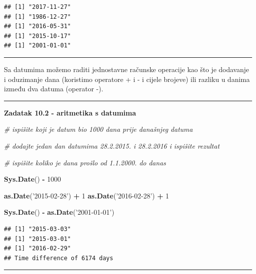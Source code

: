 \documentclass[]{book}
\newenvironment{Shaded}{\begin{snugshade}}{\end{snugshade}}
\newcommand{\KeywordTok}[1]{\textcolor[rgb]{0.13,0.29,0.53}{\textbf{#1}}}
\newcommand{\DecValTok}[1]{\textcolor[rgb]{0.00,0.00,0.81}{#1}}
\newcommand{\StringTok}[1]{\textcolor[rgb]{0.31,0.60,0.02}{#1}}
\newcommand{\CommentTok}[1]{\textcolor[rgb]{0.56,0.35,0.01}{\textit{#1}}}
\newcommand{\OperatorTok}[1]{\textcolor[rgb]{0.81,0.36,0.00}{\textbf{#1}}}
\newcommand{\NormalTok}[1]{#1}
\theoremstyle{definition}
\theoremstyle{definition}
\theoremstyle{definition}
\theoremstyle{remark}
\begin{document}
\begin{verbatim}
## [1] "2017-11-27"
## [1] "1986-12-27"
## [1] "2016-05-31"
## [1] "2015-10-17"
## [1] "2001-01-01"
\end{verbatim}

\begin{center}\rule{0.5\linewidth}{\linethickness}\end{center}

Sa datumima možemo raditi jednostavne računske operacije kao što je
dodavanje i oduzimanje dana (koristimo operatore + i - i cijele brojeve)
ili razliku u danima između dva datuma (operator -).

\begin{center}\rule{0.5\linewidth}{\linethickness}\end{center}

\textbf{Zadatak 10.2 - aritmetika s datumima}

\begin{Shaded}
\begin{Highlighting}[]
\CommentTok{# ispišite koji je datum bio 1000 dana prije današnjeg datuma}

\CommentTok{# dodajte jedan dan datumima 28.2.2015. i 28.2.2016 i ispišite rezultat}

\CommentTok{# ispišite koliko je dana prošlo od 1.1.2000. do danas}
\end{Highlighting}
\end{Shaded}

\begin{Shaded}
\begin{Highlighting}[]
\KeywordTok{Sys.Date}\NormalTok{() }\OperatorTok{-}\StringTok{ }\DecValTok{1000}

\KeywordTok{as.Date}\NormalTok{(}\StringTok{'2015-02-28'}\NormalTok{) }\OperatorTok{+}\StringTok{ }\DecValTok{1}
\KeywordTok{as.Date}\NormalTok{(}\StringTok{'2016-02-28'}\NormalTok{) }\OperatorTok{+}\StringTok{ }\DecValTok{1}

\KeywordTok{Sys.Date}\NormalTok{() }\OperatorTok{-}\StringTok{ }\KeywordTok{as.Date}\NormalTok{(}\StringTok{'2001-01-01'}\NormalTok{)}
\end{Highlighting}
\end{Shaded}

\begin{verbatim}
## [1] "2015-03-03"
## [1] "2015-03-01"
## [1] "2016-02-29"
## Time difference of 6174 days
\end{verbatim}

\begin{center}\rule{0.5\linewidth}{\linethickness}\end{center}
\end{document}
